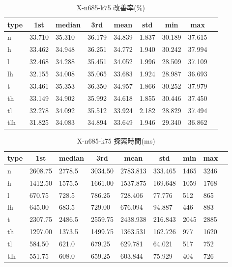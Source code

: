 \begin{table}[htbp]
    \centering
    \caption{X-n685-k75 改善率(\%)}
    \begin{tabular}{|l|l|l|l|l|l|l|l|l|}\hline
    \multicolumn{1}{|c|}{\textbf{type}}
    &\multicolumn{1}{|c|}{\textbf{1st}}
    &\multicolumn{1}{c|}{\textbf{median}}
    &\multicolumn{1}{c|}{\textbf{3rd}}
    &\multicolumn{1}{c|}{\textbf{mean}}
    &\multicolumn{1}{c|}{\textbf{std}}
    &\multicolumn{1}{c|}{\textbf{min}}
    &\multicolumn{1}{c|}{\textbf{max}}\\\hline
	n & 33.710 & 35.310 & 36.179 & 34.839 & 1.837 & 30.189 & 37.615\\\hline
	h & 33.462 & 34.948 & 36.251 & 34.772 & 1.940 & 30.242 & 37.994\\\hline
	l & 32.468 & 34.288 & 35.451 & 34.052 & 1.996 & 28.509 & 37.109\\\hline
	lh & 32.155 & 34.008 & 35.065 & 33.683 & 1.924 & 28.987 & 36.693\\\hline
	t & 33.461 & 35.353 & 36.350 & 34.957 & 1.866 & 30.252 & 37.979\\\hline
	th & 33.149 & 34.902 & 35.992 & 34.618 & 1.855 & 30.446 & 37.450\\\hline
	tl & 32.278 & 34.092 & 35.512 & 33.924 & 2.182 & 28.829 & 37.494\\\hline
	tlh & 31.825 & 34.083 & 34.894 & 33.649 & 1.946 & 29.340 & 36.862\\\hline
	\end{tabular}
\end{table}
\begin{table}[htbp]
    \centering
    \caption{X-n685-k75 探索時間(ms)}
    \begin{tabular}{|l|l|l|l|l|l|l|l|l|}\hline
    \multicolumn{1}{|c|}{\textbf{type}}
    &\multicolumn{1}{|c|}{\textbf{1st}}
    &\multicolumn{1}{c|}{\textbf{median}}
    &\multicolumn{1}{c|}{\textbf{3rd}}
    &\multicolumn{1}{c|}{\textbf{mean}}
    &\multicolumn{1}{c|}{\textbf{std}}
    &\multicolumn{1}{c|}{\textbf{min}}
    &\multicolumn{1}{c|}{\textbf{max}}\\\hline
	n & 2608.75 & 2778.5 & 3034.50 & 2783.813 & 333.465 & 1465 & 3246\\\hline
	h & 1412.50 & 1575.5 & 1661.00 & 1537.875 & 169.648 & 1059 & 1768\\\hline
	l & 670.75 & 728.5 & 786.25 & 728.406 & 77.776 & 512 & 865\\\hline
	lh & 645.00 & 683.5 & 729.00 & 676.094 & 94.887 & 446 & 883\\\hline
	t & 2307.75 & 2486.5 & 2559.75 & 2438.938 & 216.843 & 2045 & 2885\\\hline
	th & 1297.00 & 1373.5 & 1499.75 & 1363.531 & 162.726 & 977 & 1620\\\hline
	tl & 584.50 & 621.0 & 679.25 & 629.781 & 64.021 & 517 & 752\\\hline
	tlh & 551.75 & 608.0 & 659.25 & 603.844 & 75.929 & 404 & 726\\\hline
	\end{tabular}
\end{table}
